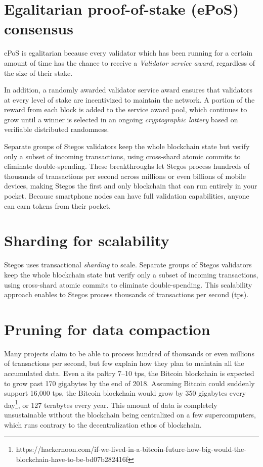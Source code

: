 \documentclass[8pt,fleqn,openany]{book}
\begin{document}
\section{Egalitarian proof-of-stake (ePoS) consensus}
ePoS is egalitarian because every validator which has been running for a certain amount of time has the chance to receive a \textit{Validator service award}, regardless of the size of their stake\footnotemark.


In addition, a randomly awarded validator service award ensures that validators at every level of stake are incentivized to maintain the network. A portion of the reward from each block is added to the service award pool, which continues to grow until a winner is selected in an ongoing \textit{cryptographic lottery} based on verifiable distributed randomness. 

Separate groups of Stegos validators keep the whole blockchain state but verify only a subset of incoming transactions, using cross-shard atomic commits to eliminate double-spending. These breakthroughs let Stegos process hundreds of thousands of transactions per second across millions or even billions of mobile devices, making Stegos the first and only blockchain that can run entirely in your pocket. Because smartphone nodes can have full validation capabilities, anyone can earn tokens from their pocket.

\section{Sharding for scalability}
Stegos uses transactional \textit{sharding} to scale. Separate groups of Stegos validators keep the whole blockchain state but verify only a subset of incoming transactions, using cross-shard atomic commits to eliminate double-spending. This scalability approach enables to Stegos process thousands of transactions per second (tps).

\section{Pruning for data compaction}
Many projects claim to be able to process hundred of thousands or even millions of transactions per second, but few explain how they plan to maintain all the accumulated data. Even a its paltry 7--10 tps, the Bitcoin blockchain is expected to grow past 170 gigabytes by the end of 2018. Assuming Bitcoin could suddenly support 16,000 tps, the Bitcoin blockchain would grow by 350 gigabytes every day\footnote{https://hackernoon.com/if-we-lived-in-a-bitcoin-future-how-big-would-the-blockchain-have-to-be-bd07b282416f}, or 127 terabytes every year. This amount of data is completely unsustainable without the blockchain being centralized on a few supercomputers, which runs contrary to the decentralization ethos of blockchain.
\end{document}

